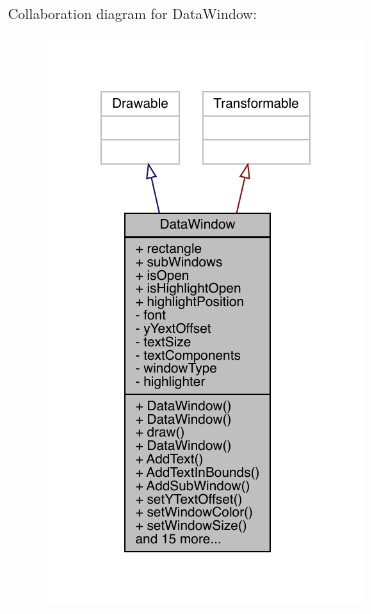 Collaboration diagram for Data\+Window\+:
\nopagebreak
\begin{figure}[H]
\begin{center}
\leavevmode
\includegraphics[width=236pt]{class_data_window__coll__graph}
\end{center}
\end{figure}
